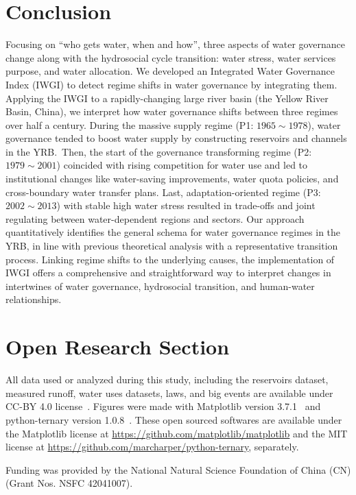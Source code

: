 \documentclass[draft]{../agujournal2019}
\begin{document}
\section{Conclusion}\label{sec13}
Focusing on ``who gets water, when and how'', three aspects of water governance change along with the hydrosocial cycle transition: water stress, water services purpose, and water allocation.
We developed an Integrated Water Governance Index (IWGI) to detect regime shifts in water governance by integrating them. Applying the IWGI to a rapidly-changing large river basin (the Yellow River Basin, China), we interpret how water governance shifts between three regimes over half a century.
During the massive supply regime (P1: $1965 \sim 1978$), water governance tended to boost water supply by constructing reservoirs and channels in the YRB.\
Then, the start of the governance transforming regime (P2: $1979 \sim 2001$) coincided with rising competition for water use and led to institutional changes like water-saving improvements, water quota policies, and cross-boundary water transfer plans.
Last, adaptation-oriented regime (P3: $2002 \sim 2013$) with stable high water stress resulted in trade-offs and joint regulating between water-dependent regions and sectors.
Our approach quantitatively identifies the general schema for water governance regimes in the YRB, in line with previous theoretical analysis with a representative transition process.
Linking regime shifts to the underlying causes, the implementation of IWGI offers a comprehensive and straightforward way to interpret changes in intertwines of water governance, hydrosocial transition, and human-water relationships.
























\section*{Open Research Section}
All data used or analyzed during this study, including the reservoirs dataset, measured runoff, water uses datasets, laws, and big events are available under CC-BY 4.0 license~\cite{shuang_song_2023_7955500}.
Figures were made with Matplotlib version 3.7.1~\cite{Hunter:2007} and python-ternary version 1.0.8~\cite{pythonternary}.
These open sourced softwares are available under the Matplotlib license at \url{https://github.com/matplotlib/matplotlib} and the MIT license at \url{https://github.com/marcharper/python-ternary}, separately.


\acknowledgments
Funding was provided by the National Natural Science Foundation of China (CN) (Grant Nos. NSFC 42041007).


\end{document}
